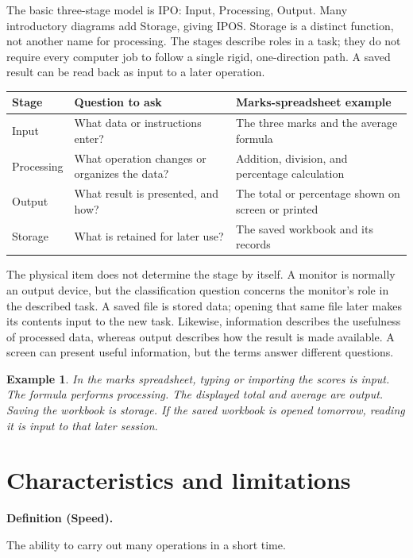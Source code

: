\documentclass[11pt]{article}
\newtheorem{example}{Example}[section]
\newenvironment{definitionbox}[1]{%
  \par\noindent\textbf{Definition (#1).}\ \itshape
}{\par\vspace{0.3em}}
\begin{document}
The basic three-stage model is IPO: Input, Processing, Output. Many
introductory diagrams add Storage, giving IPOS. Storage is a distinct
function, not another name for processing. The stages describe roles in a
task; they do not require every computer job to follow a single rigid,
one-direction path. A saved result can be read back as input to a later
operation.

\begin{center}
\begin{tabular}{p{}p{}p{}}
\toprule
\textbf{Stage} & \textbf{Question to ask} & \textbf{Marks-spreadsheet example}\\
\midrule
Input & What data or instructions enter? & The three marks and the average formula\\
Processing & What operation changes or organizes the data? & Addition, division, and percentage calculation\\
Output & What result is presented, and how? & The total or percentage shown on screen or printed\\
Storage & What is retained for later use? & The saved workbook and its records\\
\bottomrule
\end{tabular}
\end{center}

The physical item does not determine the stage by itself. A monitor is
normally an output device, but the classification question concerns the
monitor's role in the described task. A saved file is stored data; opening
that same file later makes its contents input to the new task. Likewise,
information describes the usefulness of processed data, whereas output
describes how the result is made available. A screen can present useful
information, but the terms answer different questions.

\begin{example}
In the marks spreadsheet, typing or importing the scores is input. The
formula performs processing. The displayed total and average are output.
Saving the workbook is storage. If the saved workbook is opened tomorrow,
reading it is input to that later session.
\end{example}

\section{Characteristics and limitations}
\begin{definitionbox}{Speed}
The ability to carry out many operations in a short time.
\end{definitionbox}
\end{document}
